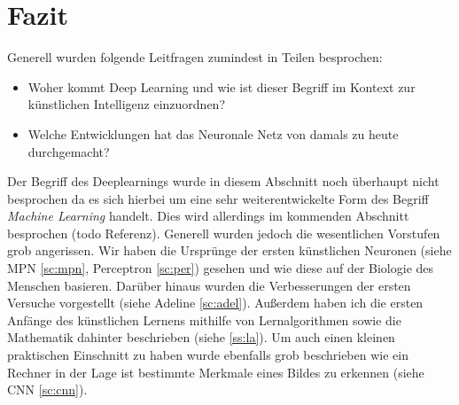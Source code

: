 \section{Fazit}

Generell wurden folgende Leitfragen zumindest in Teilen besprochen: 

\begin{itemize}
\item Woher kommt Deep Learning und wie ist dieser Begriff im Kontext zur künstlichen Intelligenz einzuordnen?
\item Welche Entwicklungen hat das Neuronale Netz von damals zu heute durchgemacht?
\end{itemize}

Der Begriff des Deeplearnings wurde in diesem Abschnitt noch überhaupt nicht besprochen da es sich hierbei um eine sehr weiterentwickelte Form des Begriff \emph{Machine Learning} handelt. Dies wird allerdings im kommenden Abschnitt besprochen (todo Referenz). Generell wurden jedoch die wesentlichen Vorstufen grob angerissen. Wir haben die Ursprünge der ersten künstlichen Neuronen (siehe MPN \ref{sc:mpn}, Perceptron \ref{sc:per}) gesehen und wie diese auf der Biologie des Menschen basieren. Darüber hinaus wurden die Verbesserungen der ersten Versuche vorgestellt (siehe Adeline \ref{sc:adel}). Außerdem haben ich die ersten Anfänge des künstlichen Lernens mithilfe von Lernalgorithmen sowie die Mathematik dahinter beschrieben (siehe \ref{ss:la}). Um auch einen kleinen praktischen Einschnitt zu haben wurde ebenfalls grob beschrieben wie ein Rechner in der Lage ist bestimmte Merkmale eines Bildes zu erkennen (siehe CNN \ref{sc:cnn}). 
